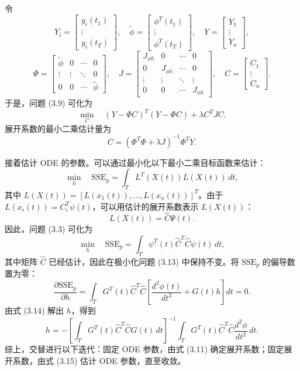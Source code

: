 令
\[
Y_i=\begin{bmatrix}y_i(t_1)\\\vdots\\y_i(t_T)\end{bmatrix},
\quad
\widetilde\phi=\begin{bmatrix}\phi^T(t_1)\\\vdots\\\phi^T(t_T)\end{bmatrix},
\quad
Y=\begin{bmatrix}Y_1\\\vdots\\Y_n\end{bmatrix},
\]
\[
\Phi=
\begin{bmatrix}
\widetilde\phi&0&\cdots&0\\
\vdots&\vdots&\ddots&0\\
0&0&\cdots&\widetilde\phi
\end{bmatrix},
\quad
J=\begin{bmatrix}
J_{\phi h}&0&\cdots&0\\
0&J_{\phi h}&\cdots&0\\
\vdots&\vdots&\ddots&\vdots\\
0&0&\cdots&J_{\phi h}
\end{bmatrix},
\quad
C=\begin{bmatrix}C_1\\\vdots\\C_n\end{bmatrix}.
\]
于是，问题 (3.9) 可化为
\begin{equation}
\min_C\quad (Y-\Phi C)^T(Y-\Phi C)+\lambda C^TJC.
\tag{3.10}
\end{equation}
展开系数的最小二乘估计量为
\begin{equation}
C=(\Phi^T\Phi+\lambda J)^{-1}\Phi^TY.
\tag{3.11}
\end{equation}

接着估计 ODE 的参数。可以通过最小化以下最小二乘目标函数来估计：
\begin{equation}
\min_h\quad \mathrm{SSE}_p=\int_TL^T(X(t))L(X(t))\,dt,
\tag{3.12}
\end{equation}
其中 $L(X(t))=[L(x_1(t)),\ldots,L(x_n(t))]^T$。由于 $L(x_i(t))=C_i^T\psi(t)$，可以用估计的展开系数表示 $L(X(t))$：
\[
L(X(t))=\widehat C\Psi(t).
\]
因此，问题 (3.3) 可化为
\begin{equation}
\min_h\quad
\mathrm{SSE}_p=\int_T\psi^T(t)\widehat C^T\widehat C\psi(t)\,dt,
\tag{3.13}
\end{equation}
其中矩阵 $\widehat C$ 已经估计，因此在极小化问题 (3.13) 中保持不变。将 $\mathrm{SSE}_p$ 的偏导数置为零：
\begin{equation}
\frac{\partial\mathrm{SSE}_p}{\partial h}
=\int_TG^T(t)\widehat C^T\widehat C
\left[\frac{d^2\phi(t)}{dt^2}+G(t)h\right]dt=0.
\tag{3.14}
\end{equation}
由式 (3.14) 解出 $h$，得到
\begin{equation}
h=-\left[\int_TG^T(t)\widehat C^T\widehat CG(t)\,dt\right]^{-1}
\int_TG^T(t)\widehat C^T\widehat C\frac{d^2\phi}{dt^2}\,dt.
\tag{3.15}
\end{equation}
综上，交替进行以下迭代：固定 ODE 参数，由式 (3.11) 确定展开系数；固定展开系数，由式 (3.15) 估计 ODE 参数，直至收敛。

